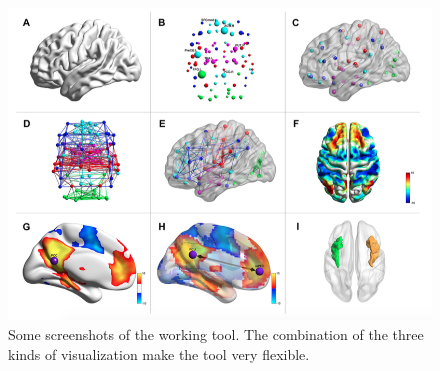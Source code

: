 \documentclass{article}
\begin{document}
\begin{multicols}{2}
\begin{figure}[ht]
\centerline{\includegraphics[width=1.9\columnwidth]{brain2}}
\caption{Some screenshots of the working tool. The combination of the three kinds of visualization make the tool very flexible.}
    \label{fig:brain2}
\end{figure}








\end{multicols}
\end{document}
